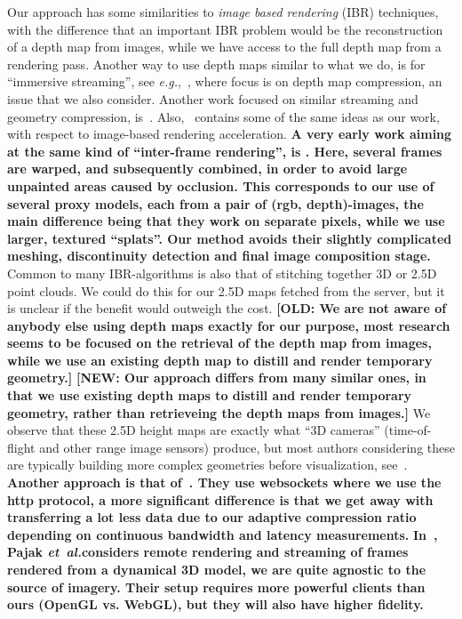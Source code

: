\documentclass[10pt,conference,compsocconf]{IEEEtran}
\newcommand{\eg}{{\em e.g.}}
\newcommand{\etal}{{\em et~al.}}
\begin{document}
Our approach has some similarities to {\em image based rendering} (IBR)
techniques, with the difference that an important IBR problem would be the
reconstruction of a depth map from images, while we have access to the full
depth map from a rendering pass.  Another way to use depth maps similar to what
we do, is for ``immersive streaming'', see \eg,~\cite{ibr}, where focus is on
depth map compression, an issue that we also consider. Another work
focused on similar streaming and geometry compression,
is~\cite{teler}. Also,~\cite{220764} contains some of the same ideas as our
work, with respect to image-based rendering acceleration.
%
\textbf{A very early work aiming at the same kind of ``inter-frame rendering'', is
\cite{Mark:1997:PW:253284.253292}. Here, several frames are warped, and
subsequently combined, in order to avoid large unpainted areas caused by
occlusion. This corresponds to our use of several proxy models, each from a pair
of (rgb, depth)-images, the main difference being that they work on separate
pixels, while we use larger, textured ``splats''. Our method avoids their
slightly complicated meshing, discontinuity detection and final image
composition stage.}
%
Common to many IBR-algorithms is also that of stitching together 3D or 2.5D
point clouds. We could do this for our 2.5D maps fetched from the server, but it
is unclear if the benefit would outweigh the cost.
%
\textbf{[OLD: We are not aware of anybody else using depth maps exactly for our purpose, most
research seems to be focused on the retrieval of the depth map from images,
while we use an existing depth map to distill and render temporary geometry.]}
\textbf{[NEW: Our approach differs from many similar ones, in that we use existing depth maps 
to distill and render temporary geometry, rather than retrieveing the depth maps from images.]}
%
We observe that these 2.5D height maps are exactly what ``3D cameras''
(time-of-flight and other range image sensors) produce, but most authors
considering these are typically building more complex geometries before
visualization, see~\cite{IMM2009-05801}.
%
\textbf{Another approach is that of~\cite{altenhofen16rixels}. They use websockets
where we use the http protocol, a more significant difference is that we get
away with transferring a lot less data due to our adaptive compression ratio
depending on continuous bandwidth and latency measurements.
%
}
%
\textbf{In~\cite{CGF:CGF1871}, Pajak \etal considers remote rendering and
  streaming of frames rendered from a dynamical 3D model, we are quite agnostic
  to the source of imagery. Their setup requires more powerful clients than ours
  (OpenGL vs. WebGL), but they will also have higher fidelity.  }
\end{document}
